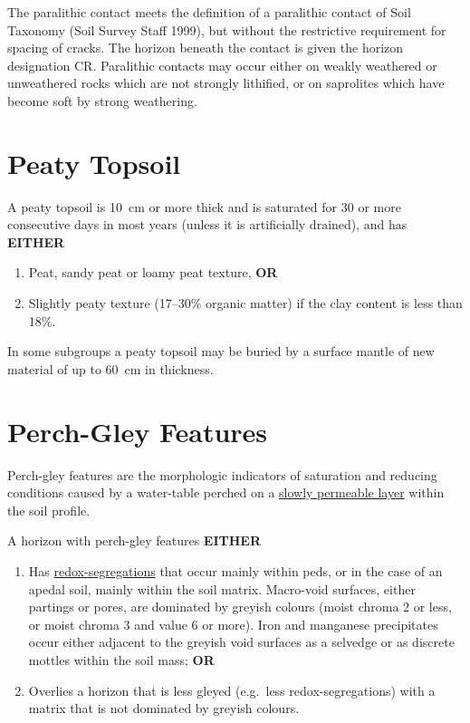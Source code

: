 \documentclass[
  letterpaper,
  DIV=11,
  numbers=noendperiod]{scrreprt}
\providecommand{\tightlist}{%
  \setlength{\itemsep}{0pt}\setlength{\parskip}{0pt}}\usepackage{longtable,booktabs,array}
\begin{document}
The paralithic contact meets the definition of a paralithic contact of
Soil Taxonomy (Soil Survey Staff 1999), but without the restrictive
requirement for spacing of cracks. The horizon beneath the contact is
given the horizon designation CR. Paralithic contacts may occur either
on weakly weathered or unweathered rocks which are not strongly
lithified, or on saprolites which have become soft by strong weathering.

\hypertarget{sec-diag-pts}{%
\section{Peaty Topsoil}\label{sec-diag-pts}}

A peaty topsoil is 10~cm or more thick and is saturated for 30 or more
consecutive days in most years (unless it is artificially drained), and
has \textbf{EITHER}

\begin{enumerate}
\def\labelenumi{\arabic{enumi}.}
\tightlist
\item
  Peat, sandy peat or loamy peat texture, \textbf{OR}
\item
  Slightly peaty texture (17--30\% organic matter) if the clay content
  is less than 18\%.
\end{enumerate}

In some subgroups a peaty topsoil may be buried by a surface mantle of
new material of up to 60~cm in thickness.

\hypertarget{sec-diag-pgley}{%
\section{Perch-Gley Features}\label{sec-diag-pgley}}

Perch-gley features are the morphologic indicators of saturation and
reducing conditions caused by a water-table perched on a
\protect\hyperlink{sec-diag-slowp}{slowly permeable layer} within the
soil profile.

A horizon with perch-gley features \textbf{EITHER}

\begin{enumerate}
\def\labelenumi{\arabic{enumi}.}
\tightlist
\item
  Has \protect\hyperlink{sec-diag-rsegs}{redox-segregations} that occur
  mainly within peds, or in the case of an apedal soil, mainly within
  the soil matrix. Macro-void surfaces, either partings or pores, are
  dominated by greyish colours (moist chroma 2 or less, or moist chroma
  3 and value 6 or more). Iron and manganese precipitates occur either
  adjacent to the greyish void surfaces as a selvedge or as discrete
  mottles within the soil mass; \textbf{OR}
\item
  Overlies a horizon that is less gleyed (e.g.~less redox-segregations)
  with a matrix that is not dominated by greyish colours.
\end{enumerate}
\end{document}
